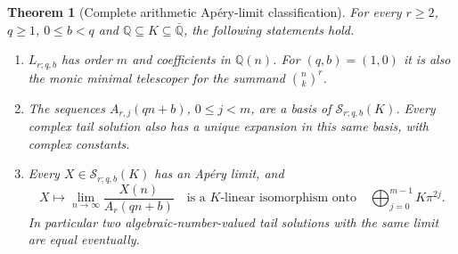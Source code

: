 \documentclass[11pt,a4paper]{article}
\newtheorem{theorem}{Theorem}[section]
\theoremstyle{definition}
\theoremstyle{remark}
\numberwithin{equation}{section}
\begin{document}
\begin{theorem}[Complete arithmetic Ap\'ery-limit classification]
\label{p8:ac:apery}
For every $r\ge2$, $q\ge1$, $0\le b<q$ and
$\mathbb Q\subseteq K\subseteq\overline{\mathbb Q}$, the following
statements hold.
\begin{enumerate}
\item $L_{r;q,b}$ has order $m$ and coefficients in $\mathbb Q(n)$.
For $(q,b)=(1,0)$ it is also the monic minimal telescoper for the
summand $\binom nk^r$.
\item The sequences $A_{r,j}(qn+b)$, $0\le j<m$, are a basis of
$\mathcal S_{r;q,b}(K)$. Every complex tail solution also has a
unique expansion in this same basis, with complex constants.
\item Every $X\in\mathcal S_{r;q,b}(K)$ has an Ap\'ery limit, and
\begin{equation}\label{p8:ac:limit-isomorphism}
 X\longmapsto \lim_{n\to\infty}\frac{X(n)}{A_r(qn+b)}
 \quad\text{is a $K$-linear isomorphism onto}\quad
 \bigoplus_{j=0}^{m-1}K\pi^{2j}.
\end{equation}
In particular two algebraic-number-valued tail solutions with the
same limit are equal eventually.
\end{enumerate}
\end{theorem}
\end{document}
